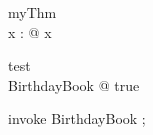 \begin{theorem}{ myThm}\\
 \forall x : \nat @ x  \\

\end{theorem}



\begin{theorem}{ test}\\
 \forall BirthdayBook @ true \\

\end{theorem}



\begin{zproof}[test]

 invoke BirthdayBook ;
 

\end{zproof}




